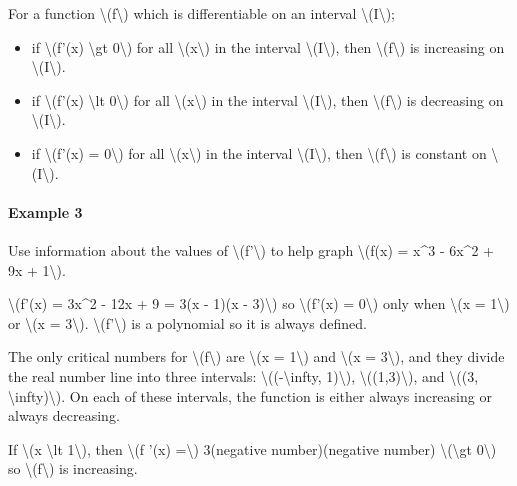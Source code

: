For a function \textbackslash{}(f\textbackslash{}) which is
differentiable on an interval \textbackslash{}(I\textbackslash{});

\begin{itemize}
\tightlist
\item
  if \textbackslash{}(f'(x) \textbackslash{}gt 0\textbackslash{}) for
  all \textbackslash{}(x\textbackslash{}) in the interval
  \textbackslash{}(I\textbackslash{}), then
  \textbackslash{}(f\textbackslash{}) is increasing on
  \textbackslash{}(I\textbackslash{}).
\item
  if \textbackslash{}(f'(x) \textbackslash{}lt 0\textbackslash{}) for
  all \textbackslash{}(x\textbackslash{}) in the interval
  \textbackslash{}(I\textbackslash{}), then
  \textbackslash{}(f\textbackslash{}) is decreasing on
  \textbackslash{}(I\textbackslash{}).
\item
  if \textbackslash{}(f'(x) = 0\textbackslash{}) for all
  \textbackslash{}(x\textbackslash{}) in the interval
  \textbackslash{}(I\textbackslash{}), then
  \textbackslash{}(f\textbackslash{}) is constant on
  \textbackslash{}(I\textbackslash{}).
\end{itemize}

\hypertarget{example-3}{%
\paragraph{Example 3}\label{example-3}}

Use information about the values of \textbackslash{}(f'\textbackslash{})
to help graph \textbackslash{}(f(x) = x\^{}3 - 6x\^{}2 + 9x +
1\textbackslash{}).

\textbackslash{}(f'(x) = 3x\^{}2 - 12x + 9 = 3(x - 1)(x -
3)\textbackslash{}) so \textbackslash{}(f'(x) = 0\textbackslash{}) only
when \textbackslash{}(x = 1\textbackslash{}) or \textbackslash{}(x =
3\textbackslash{}). \textbackslash{}(f'\textbackslash{}) is a polynomial
so it is always defined.

The only critical numbers for \textbackslash{}(f\textbackslash{}) are
\textbackslash{}(x = 1\textbackslash{}) and \textbackslash{}(x =
3\textbackslash{}), and they divide the real number line into three
intervals: \textbackslash{}((-\textbackslash{}infty,
1)\textbackslash{}), \textbackslash{}((1,3)\textbackslash{}), and
\textbackslash{}((3, \textbackslash{}infty)\textbackslash{}). On each of
these intervals, the function is either always increasing or always
decreasing.

If \textbackslash{}(x \textbackslash{}lt 1\textbackslash{}), then
\textbackslash{}(f '(x) =\textbackslash{}) 3(negative number)(negative
number) \textbackslash{}(\textbackslash{}gt 0\textbackslash{}) so
\textbackslash{}(f\textbackslash{}) is increasing.

